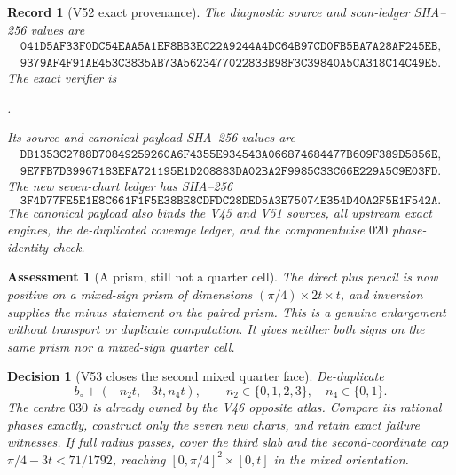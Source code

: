\documentclass[11pt,oneside]{article}
\newtheorem{assessment}[theorem]{Assessment}
\newtheorem{record}[theorem]{Record}
\newtheorem{decision}[theorem]{Decision}
\theoremstyle{definition}
\theoremstyle{remark}
\begin{document}
\begin{record}[V52 exact provenance]
\label{rec:newv52-provenance}
The diagnostic source and scan-ledger SHA--256 values are
\[
\begin{gathered}
\texttt{041D5AF33F0DC54EAA5A1EF8BB3EC22A9244A4DC64B97CD0FB5BA7A28AF245EB},\\
\texttt{9379AF4F91AE453C3835AB73A562347702283BB98F3C39840A5CA318C14C49E5}.
\end{gathered}                                         \tag{52.11}
\]
The exact verifier is
\begin{center}
\footnotesize
{}.
\end{center}
Its source and canonical-payload SHA--256 values are
\[
\begin{gathered}
\texttt{DB1353C2788D70849259260A6F4355E934543A066874684477B609F389D5856E},\\
\texttt{9E7FB7D39967183EFA721195E1D208883DA02BA2F9985C33C66E229A5C9E03FD}.
\end{gathered}                                         \tag{52.12}
\]
The new seven-chart ledger has SHA--256
\[
\texttt{3F4D77FE5E1E8C661F1F5E38BE8CDFDC28DED5A3E75074E354D40A2F5E1F542A}.
                                                               \tag{52.13}
\]
The canonical payload also binds the V45 and V51 sources, all
upstream exact engines, the de-duplicated coverage ledger, and the
componentwise \(020\) phase-identity check.
\end{record}

\begin{assessment}[A prism, still not a quarter cell]
\label{ass:newv52}
The direct plus pencil is now positive on a mixed-sign prism of
dimensions \((\pi/4)\times2t\times t\), and inversion supplies the
minus statement on the paired prism.  This is a genuine enlargement
without transport or duplicate computation.  It gives neither both
signs on the same prism nor a mixed-sign quarter cell.
\end{assessment}

\begin{decision}[V53 closes the second mixed quarter face]
\label{dec:newv52-next}
De-duplicate
\[
 b_\circ+(-n_2t,-3t,n_4t),
 \qquad n_2\in\{0,1,2,3\},\quad n_4\in\{0,1\}.         \tag{52.14}
\]
The centre \(030\) is already owned by the V46 opposite atlas.
Compare its rational phases exactly, construct only the seven new
charts, and retain exact failure witnesses.  If full radius passes,
cover the third slab and the second-coordinate cap
\(\pi/4-3t<71/1792\), reaching
\([0,\pi/4]^2\times[0,t]\) in the mixed orientation.
\end{decision}
\end{document}
